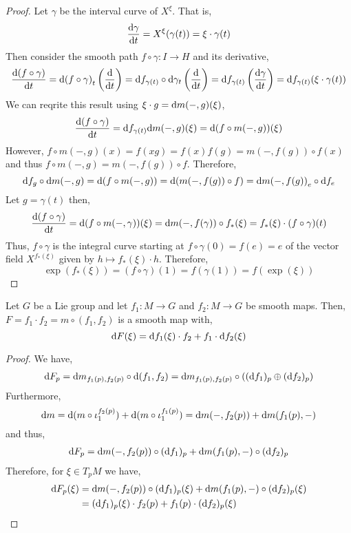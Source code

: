 \documentclass[12pt]{article}
\begin{document}
\begin{proof}
Let $\gamma$ be the interval curve of $X^\xi$. That is,
\[ \frac{\mathrm{d}{\gamma}}{\mathrm{d}{t}} = X^{\xi}(\gamma(t)) = \xi \cdot \gamma(t) \]
Then consider the smooth path $f \circ \gamma : I \to H$ and its derivative,
\[ \frac{\mathrm{d}{(f \circ \gamma)}}{\mathrm{d}{t}} = \mathrm{d}{(f \circ \gamma)}_t\left( \frac{\mathrm{d}{}}{\mathrm{d}{t}} \right) = \mathrm{d}{f}_{\gamma(t)} \circ \mathrm{d}{\gamma}_t \left( \frac{\mathrm{d}{}}{\mathrm{d}{t}} \right) = \mathrm{d}{f}_{\gamma(t)} \left( \frac{\mathrm{d}{\gamma}}{\mathrm{d}{t}} \right) = \mathrm{d}{f}_{\gamma(t)} (\xi \cdot \gamma(t)) \]
We can reqrite this result using $\xi \cdot g = \mathrm{d}{m(-,g)}(\xi)$,
\begin{align*}
\frac{\mathrm{d}{(f \circ \gamma)}}{\mathrm{d}{t}} = \mathrm{d}{f}_{\gamma(t)} \mathrm{d}{m(-,g)}(\xi) = \mathrm{d}{(f \circ m(-,g))}(\xi) 
\end{align*}
However, $f \circ m(-,g)(x) = f(xg) = f(x) f(g) = m(-,f(g)) \circ f(x)$ and thus $f \circ m(-,g) = m(-,f(g)) \circ f$. Therefore,
\[ \mathrm{d}{f}_g \circ \mathrm{d}{m(-,g)} = \mathrm{d}{(f \circ m(-,g))} = \mathrm{d}{(m(-,f(g)) \circ f)} = \mathrm{d}{m(-,f(g))}_e \circ \mathrm{d}{f}_e \]
Let $g = \gamma(t)$ then,
\begin{align*}
\frac{\mathrm{d}{(f \circ \gamma)}}{\mathrm{d}{t}} = \mathrm{d}{(f \circ m(-, \gamma))}(\xi) = \mathrm{d}{m(-,f(\gamma))} \circ f_*(\xi) = f_*(\xi) \cdot (f \circ \gamma)(t)
\end{align*}
Thus, $f \circ \gamma$ is the integral curve starting at $f \circ \gamma(0) = f(e) = e$ of the vector field $X^{f_*(\xi)}$ given by $h \mapsto f_*(\xi) \cdot h$. Therefore,
\[ \exp(f_*(\xi)) = (f \circ \gamma)(1) = f(\gamma(1)) = f(\exp(\xi)) \]
\end{proof}

\begin{lemma}
Let $G$ be a Lie group and let $f_1 : M \to G$ and $f_2 : M \to G$ be smooth maps. Then, $F = f_1 \cdot f_2 = m \circ (f_1, f_2)$ is a smooth map with,
\[ \mathrm{d}{F}(\xi) = \mathrm{d}{f_1}(\xi) \cdot f_2 + f_1 \cdot \mathrm{d}{f_2}(\xi) \] 
\end{lemma}

\begin{proof}
We have,
\begin{align*}
\mathrm{d}{F}_p = \mathrm{d}{m}_{f_1(p), f_2(p)} \circ \mathrm{d}{(f_1, f_2)} = \mathrm{d}{m}_{f_1(p), f_2(p)} \circ ((\mathrm{d}{f_1})_p \oplus (\mathrm{d}{f_2})_p)
\end{align*}
Furthermore,
\[ \mathrm{d}{m} = \mathrm{d}{(m \circ \iota_1^{f_2(p)})} + \mathrm{d}{(m \circ \iota_1^{f_1(p)})} = \mathrm{d}{m(-,f_2(p))} + \mathrm{d}{m(f_1(p),-)} \]
and thus,
\begin{align*}
\mathrm{d}{F}_p = \mathrm{d}{m(-,f_2(p))} \circ (\mathrm{d}{f_1})_p + \mathrm{d}{m(f_1(p),-)} \circ (\mathrm{d}{f_2})_p
\end{align*}
Therefore, for $\xi \in T_p M$ we have,
\begin{align*}
\mathrm{d}{F}_p(\xi) & = \mathrm{d}{m(-,f_2(p))} \circ (\mathrm{d}{f_1})_p(\xi) + \mathrm{d}{m(f_1(p),-)} \circ (\mathrm{d}{f_2})_p(\xi)
\\
& = (\mathrm{d}{f_1})_p(\xi) \cdot f_2(p) + f_1(p) \cdot (\mathrm{d}{f_2})_p(\xi)
\end{align*}
\end{proof}
\end{document}
